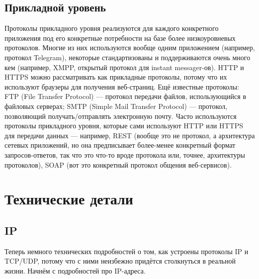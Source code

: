\documentclass{../../text-style}
\begin{document}
\subsection{Прикладной уровень}

Протоколы прикладного уровня реализуются для каждого конкретного приложения под его конкретные потребности на базе более низкоуровневых протоколов. Многие из них используются вообще одним приложением (например, протокол Telegram), некоторые стандартизованы и поддерживаются очень много кем (например, XMPP, открытый протокол для instant messager-ов). HTTP и HTTPS можно рассматривать как прикладные протоколы, потому что их используют браузеры для получения веб-страниц. Ещё известные протоколы: FTP (File Transfer Protocol) --- протокол передачи файлов, использующийся в файловых серверах; SMTP (Simple Mail Transfer Protocol) --- протокол, позволяющий получать/отправлять электронную почту. Часто используются протоколы прикладного уровня, которые сами используют HTTP или HTTPS для передачи данных --- например, REST (вообще это не протокол, а архитектура сетевых приложений, но она предписывает более-менее конкретный формат запросов-ответов, так что это что-то вроде протокола или, точнее, архитектуры протоколов), SOAP (вот это конкретный протокол общения веб-сервисов).

\section{Технические детали}

\subsection{IP}

Теперь немного технических подробностей о том, как устроены протоколы IP и TCP/UDP, потому что с ними неизбежно придётся столкнуться в реальной жизни. Начнём с подробностей про IP-адреса.
\end{document}
